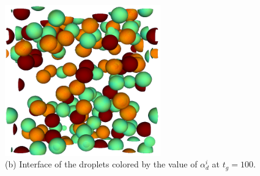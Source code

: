 \begin{figure}[h!]
    \centering
    \includegraphics[width = 0.6\textwidth]{image/VOF2.png}
    \caption{
    (b) Interface of the droplets colored by the value of $\alpha_d^i$ at $t_g =100$.
    }
    \label{fig:diagram}
\end{figure}


